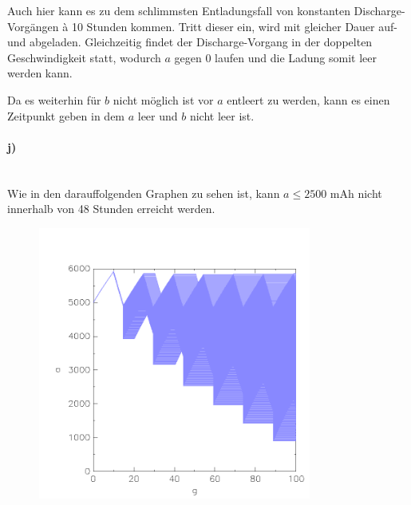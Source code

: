 Auch hier kann es zu dem schlimmsten Entladungsfall von konstanten Discharge-Vorgängen à 10 Stunden kommen. Tritt dieser ein, wird mit gleicher Dauer auf- und abgeladen. Gleichzeitig findet der Discharge-Vorgang in der doppelten Geschwindigkeit statt, wodurch $a$ gegen 0 laufen und die Ladung somit leer werden kann.  

Da es weiterhin für $b$ nicht möglich ist vor $a$ entleert zu werden, kann es einen Zeitpunkt geben in dem $a$ leer und $b$ nicht leer ist. 

\paragraph{j)}\mbox{} \\

Wie in den darauffolgenden Graphen zu sehen ist, kann $a\leq 2500$ mAh nicht innerhalb von 48 Stunden erreicht werden.  \\
\begin{minipage}[t]{0.5\textwidth} 
	\begin{figure}[H]
		\centering
		\includegraphics[width=0.8\textwidth]{Aufgabe_j1).png}
	\end{figure}
\end{minipage}
\hfill
